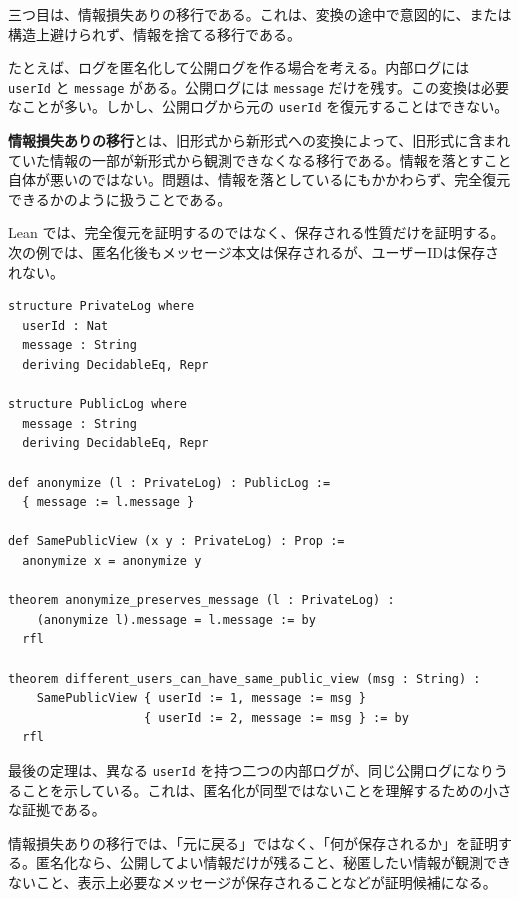 三つ目は、情報損失ありの移行である。これは、変換の途中で意図的に、または構造上避けられず、情報を捨てる移行である。

たとえば、ログを匿名化して公開ログを作る場合を考える。内部ログには \texttt{userId} と \texttt{message} がある。公開ログには \texttt{message} だけを残す。この変換は必要なことが多い。しかし、公開ログから元の \texttt{userId} を復元することはできない。

\begin{definitionbox}
\textbf{情報損失ありの移行}とは、旧形式から新形式への変換によって、旧形式に含まれていた情報の一部が新形式から観測できなくなる移行である。情報を落とすこと自体が悪いのではない。問題は、情報を落としているにもかかわらず、完全復元できるかのように扱うことである。
\end{definitionbox}

Lean では、完全復元を証明するのではなく、保存される性質だけを証明する。次の例では、匿名化後もメッセージ本文は保存されるが、ユーザーIDは保存されない。

\begin{listing}[htbp]
\begin{verbatim}
structure PrivateLog where
  userId : Nat
  message : String
  deriving DecidableEq, Repr

structure PublicLog where
  message : String
  deriving DecidableEq, Repr

def anonymize (l : PrivateLog) : PublicLog :=
  { message := l.message }

def SamePublicView (x y : PrivateLog) : Prop :=
  anonymize x = anonymize y

theorem anonymize_preserves_message (l : PrivateLog) :
    (anonymize l).message = l.message := by
  rfl

theorem different_users_can_have_same_public_view (msg : String) :
    SamePublicView { userId := 1, message := msg }
                   { userId := 2, message := msg } := by
  rfl
\end{verbatim}
\caption{匿名化は情報損失を伴うが、保存される性質は証明できる}
\label{lst:ch21-lossy-log}
\end{listing}

最後の定理は、異なる \texttt{userId} を持つ二つの内部ログが、同じ公開ログになりうることを示している。これは、匿名化が同型ではないことを理解するための小さな証拠である。

\begin{intuitionbox}
情報損失ありの移行では、「元に戻る」ではなく、「何が保存されるか」を証明する。匿名化なら、公開してよい情報だけが残ること、秘匿したい情報が観測できないこと、表示上必要なメッセージが保存されることなどが証明候補になる。
\end{intuitionbox}

